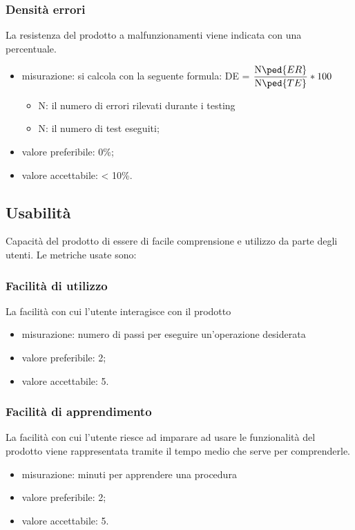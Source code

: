 	\subsubsection{Densità errori}
	La resistenza del prodotto a malfunzionamenti viene indicata con una percentuale.
	\begin{itemize}
	\item{misurazione: si calcola con la seguente formula: DE = $\displaystyle\frac{\mbox{N}\ped{ER}}{\mbox{N}\ped{TE}}*100$ 
		\begin{itemize}
		\item {{N}: il numero di errori rilevati durante i testing} 
		\item {{N}: il numero di test eseguiti;}
		\end{itemize}}
	\item {valore preferibile: 0\%;}
	\item {valore accettabile: < 10\%.}
	\end{itemize}

\subsection{Usabilità}
Capacità del prodotto di essere di facile comprensione e utilizzo da parte degli utenti.
Le metriche usate sono:
	\subsubsection{Facilità di utilizzo}
	La facilità con cui l'utente interagisce con il prodotto
	\begin{itemize}
	\item {misurazione: numero di passi per eseguire un'operazione desiderata}
	\item {valore preferibile: 2;}
	\item {valore accettabile: 5.}
	\end{itemize}
	\subsubsection{Facilità di apprendimento}
	La facilità con cui l'utente riesce ad imparare ad usare le funzionalità del prodotto viene rappresentata tramite il tempo medio che serve per comprenderle.
	\begin{itemize}
	\item {misurazione: minuti per apprendere una procedura}
	\item {valore preferibile: 2;}
	\item {valore accettabile: 5.}
	\end{itemize}
